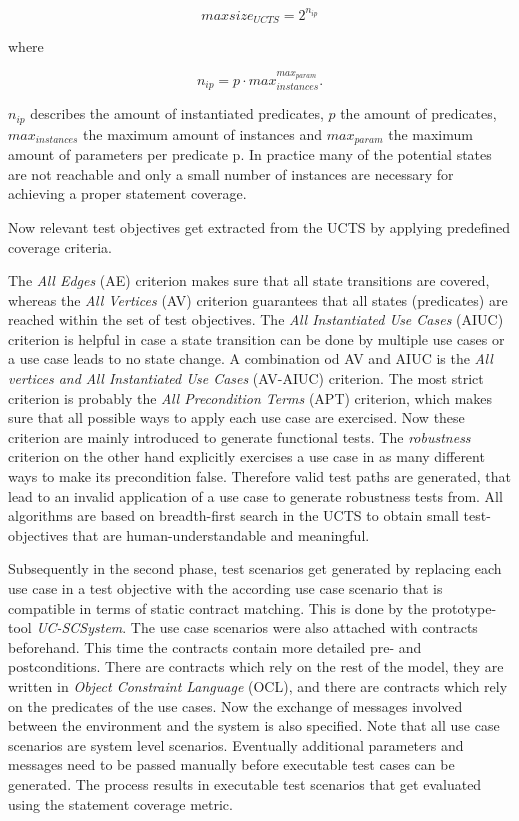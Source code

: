 \begin{equation}
	maxsize_{UCTS} = 2^{n_{ip}}
\end{equation}

where

\begin{equation}
	n_{ip} = p \cdot max_{instances}^{max_{param}}.
\end{equation}

$n_{ip}$ describes the amount of instantiated predicates, $p$ the amount of predicates, $max_{instances}$ the maximum amount of instances and $max_{param}$ the maximum amount of parameters per predicate p. In practice many of the potential states are not reachable and only a small number of instances are necessary for achieving a proper statement coverage. 

Now relevant test objectives get extracted from the UCTS by applying predefined coverage criteria. 

The \textit{All Edges} (AE) criterion makes sure that all state transitions are covered, whereas the \textit{All Vertices} (AV) criterion guarantees that all states (predicates) are reached within the set of test objectives.  The \textit{All Instantiated Use Cases} (AIUC) criterion is helpful in case a state transition can be done by multiple use cases or a use case leads to no state change. A combination od AV and AIUC is the \textit{All vertices and All Instantiated Use Cases} (AV-AIUC) criterion. The most strict criterion is probably the \textit{All Precondition Terms} (APT) criterion, which makes sure that all possible ways to apply each use case are exercised. Now these criterion are mainly introduced to generate functional tests. The \textit{robustness} criterion on the other hand explicitly exercises a use case in as many different ways to make its precondition false. Therefore valid test paths are generated, that lead to an invalid application of a use case to generate robustness tests from. All algorithms are based on breadth-first search in the UCTS to obtain small test-objectives that are human-understandable and meaningful. 

Subsequently in the second phase, test scenarios get generated by replacing each use case in a test objective with the according use case scenario that is compatible in terms of static contract matching. This is done by the prototype-tool \textit{UC-SCSystem}. The use case scenarios were also attached with contracts beforehand. This time the contracts contain more detailed pre- and postconditions. There are contracts which rely on the rest of the model, they are written in \textit{Object Constraint Language} (OCL), and there are contracts which rely on the predicates of the use cases. Now the exchange of messages involved between the environment and the system is also specified. Note that all use case scenarios are system level scenarios. Eventually additional parameters and messages need to be passed manually before executable test cases can be generated. The process results in executable test scenarios that get evaluated using the statement coverage metric.

